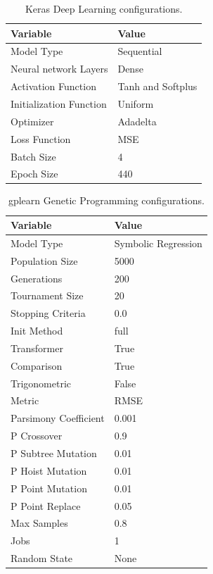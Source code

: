 \documentclass[journal]{IEEEtran}
\begin{document}
\begin{table}
\centering
\caption{Keras Deep Learning configurations.}
\label{tab:bitstreamKeras}
\begin{tabular}{|l||l|} \hline
Variable & Value \\ \hline
Model Type & Sequential  \\ \hline
Neural network Layers & Dense  \\ \hline
Activation Function & Tanh and Softplus  \\ \hline
Initialization Function & Uniform  \\ \hline
Optimizer & Adadelta  \\ \hline
Loss Function & MSE  \\ \hline
Batch Size & 4  \\ \hline
Epoch Size & 440  \\ \hline
\end{tabular}
\end{table}
\vspace{-0.5cm}

\begin{table}
\centering
\caption{gplearn Genetic Programming configurations.}
\label{tab:bitstreamgplearn}
\begin{tabular}{|l||l|} \hline
Variable & Value \\ \hline
Model Type & Symbolic Regression  \\ \hline
Population Size  & 5000  \\ \hline
Generations & 200  \\ \hline
Tournament Size & 20  \\ \hline
Stopping Criteria & 0.0  \\ \hline
Init Method & full  \\ \hline
Transformer & True  \\ \hline
Comparison & True  \\ \hline
Trigonometric & False  \\ \hline
Metric & RMSE  \\ \hline
Parsimony Coefficient & 0.001 \\ \hline
P Crossover & 0.9 \\ \hline
P Subtree Mutation & 0.01 \\ \hline
P Hoist Mutation & 0.01 \\ \hline
P Point Mutation & 0.01 \\ \hline
P Point Replace & 0.05 \\ \hline
Max Samples & 0.8 \\ \hline
Jobs & 1 \\ \hline
Random State & None \\ \hline
\end{tabular}
\vspace{-0.3cm}
\end{table}
\end{document}
